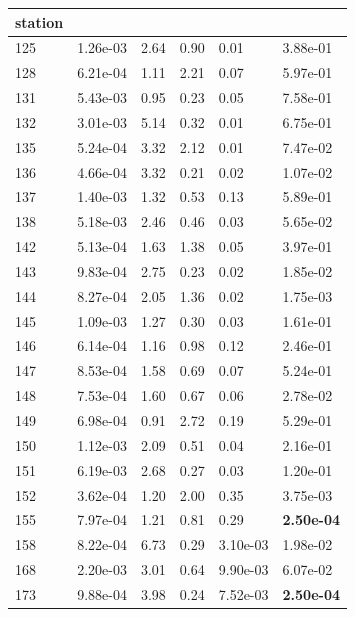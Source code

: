 \begin{figure}[htbp!]
{\begin{minipage}[t]{0.48\linewidth}
\begin{tabular}{llllll}
        station &  &  &  &  &  \\
        \midrule
                    125 & 1.26e-03 & 2.64 & 0.90 & 0.01 & 3.88e-01\\
                    128 & 6.21e-04 & 1.11 & 2.21 & 0.07 & 5.97e-01\\
                    131 & 5.43e-03 & 0.95 & 0.23 & 0.05 & 7.58e-01\\
                    132 & 3.01e-03 & 5.14 & 0.32 & 0.01 & 6.75e-01\\
                    135 & 5.24e-04 & 3.32 & 2.12 & 0.01 & 7.47e-02\\
                    136 & 4.66e-04 & 3.32 & 0.21 & 0.02 & 1.07e-02\\
                    137 & 1.40e-03 & 1.32 & 0.53 & 0.13 & 5.89e-01\\
                    138 & 5.18e-03 & 2.46 & 0.46 & 0.03 & 5.65e-02\\
                    142 & 5.13e-04 & 1.63 & 1.38 & 0.05 & 3.97e-01\\
                    143 & 9.83e-04 & 2.75 & 0.23 & 0.02 & 1.85e-02\\
                    144 & 8.27e-04 & 2.05 & 1.36 & 0.02 & 1.75e-03\\
                    145 & 1.09e-03 & 1.27 & 0.30 & 0.03 & 1.61e-01\\
                    146 & 6.14e-04 & 1.16 & 0.98 & 0.12 & 2.46e-01\\
                    147 & 8.53e-04 & 1.58 & 0.69 & 0.07 & 5.24e-01\\
                    148 & 7.53e-04 & 1.60 & 0.67 & 0.06 & 2.78e-02\\
                    149 & 6.98e-04 & 0.91 & 2.72 & 0.19 & 5.29e-01\\
                    150 & 1.12e-03 & 2.09 & 0.51 & 0.04 & 2.16e-01\\
                    151 & 6.19e-03 & 2.68 & 0.27 & 0.03 & 1.20e-01\\
                    152 & 3.62e-04 & 1.20 & 2.00 & 0.35 & 3.75e-03\\
                    155 & 7.97e-04 & 1.21 & 0.81 & 0.29 & \textbf{2.50e-04}\\
                    158 & 8.22e-04 & 6.73 & 0.29 & 3.10e-03 & 1.98e-02\\
                    168 & 2.20e-03 & 3.01 & 0.64 & 9.90e-03 & 6.07e-02\\
                    173 & 9.88e-04 & 3.98 & 0.24 & 7.52e-03 & \textbf{2.50e-04}\\

\end{tabular}
\end{minipage}}
\end{figure}
